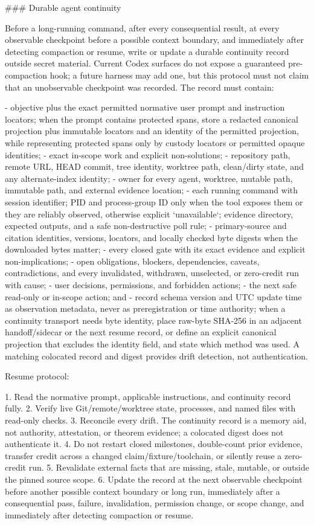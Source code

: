 \documentclass[11pt]{article}
\begin{document}
\begin{markdown}
### Durable agent continuity

Before a long-running command, after every consequential result, at every observable checkpoint
before a possible context boundary, and immediately after detecting compaction or resume, write or
update a durable continuity record outside secret material. Current Codex surfaces do not expose a
guaranteed pre-compaction hook; a future harness may add one, but this protocol must not claim that
an unobservable checkpoint was recorded. The record must contain:

- objective plus the exact permitted normative user prompt and instruction locators; when the
  prompt contains protected spans, store a redacted canonical projection plus immutable locators
  and an identity of the permitted projection, while representing protected spans only by custody
  locators or permitted opaque identities;
- exact in-scope work and explicit non-solutions;
- repository path, remote URL, HEAD commit, tree identity, worktree path, clean/dirty state, and any
  alternate-index identity;
- owner for every agent, worktree, mutable path, immutable path, and external evidence location;
- each running command with session identifier; PID and process-group ID only when the tool exposes
  them or they are reliably observed, otherwise explicit `unavailable`; evidence directory,
  expected outputs, and a safe non-destructive poll rule;
- primary-source and citation identities, versions, locators, and locally checked byte digests when
  the downloaded bytes matter;
- every closed gate with its exact evidence and explicit non-implications;
- open obligations, blockers, dependencies, caveats, contradictions, and every invalidated,
  withdrawn, unselected, or zero-credit run with cause;
- user decisions, permissions, and forbidden actions;
- the next safe read-only or in-scope action; and
- record schema version and UTC update time as observation metadata, never as preregistration or
  time authority; when a continuity transport needs byte identity, place raw-byte SHA-256 in an
  adjacent handoff/sidecar or the next resume record, or define an explicit canonical projection
  that excludes the identity field, and state which method was used. A matching colocated record
  and digest provides drift detection, not authentication.

Resume protocol:

1. Read the normative prompt, applicable instructions, and continuity record fully.
2. Verify live Git/remote/worktree state, processes, and named files with read-only checks.
3. Reconcile every drift. The continuity record is a memory aid, not authority, attestation, or
   theorem evidence; a colocated digest does not authenticate it.
4. Do not restart closed milestones, double-count prior evidence, transfer credit across a changed
   claim/fixture/toolchain, or silently reuse a zero-credit run.
5. Revalidate external facts that are missing, stale, mutable, or outside the pinned source scope.
6. Update the record at the next observable checkpoint before another possible context boundary or
   long run, immediately after a consequential pass, failure, invalidation, permission change, or
   scope change, and immediately after detecting compaction or resume.


\end{markdown}
\end{document}

